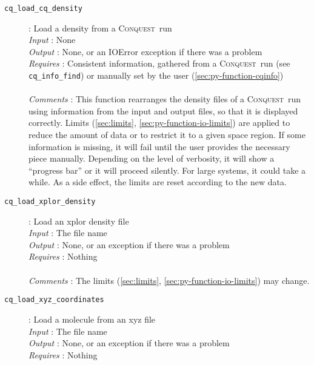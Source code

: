 \documentclass[a4paper,notitlepage,11pt]{article}
\def\CQ{\textsc{Conquest}}
\begin{document}
\begin{description}
\item[\texttt{cq\_load\_cq\_density}]: Load a density from a \CQ\ run \\
  \emph{Input} : None\\
  \emph{Output} : None, or an IOError exception if there was a problem\\
  \emph{Requires} : Consistent information, gathered from a \CQ\ run (see \texttt{cq\_info\_find}) 
  or manually set by the user (\ref{sec:py-function-cqinfo})\\
  \\
  \emph{Comments} : This function rearranges the density files of a \CQ\ run using information from the input and 
  output files, so that it is displayed correctly. Limits (\ref{sec:limits}, \ref{sec:py-function-io-limits}) 
  are applied to reduce the amount of data
  or to restrict it to a given space region.
  If some information is missing, it will fail until the user provides the necessary piece manually.
  Depending on the level of verbosity, it will show a ``progress bar'' or it will proceed silently. For large systems,
  it could take a while. As a side effect, the limits are reset according to the new data.\\ 
\end{description}

\begin{description}
\item[\texttt{cq\_load\_xplor\_density}]: Load an xplor density file\\
  \emph{Input} : The file name\\
  \emph{Output} : None, or an exception if there was a problem\\
  \emph{Requires} : Nothing\\
  \\
  \emph{Comments} : The limits (\ref{sec:limits}, \ref{sec:py-function-io-limits}) may change.
\end{description}

\begin{description}
\item[\texttt{cq\_load\_xyz\_coordinates}]: Load a molecule from an xyz file\\
  \emph{Input} : The file name\\
  \emph{Output} : None, or an exception if there was a problem\\
  \emph{Requires} : Nothing\\
\end{description}
\end{document}
